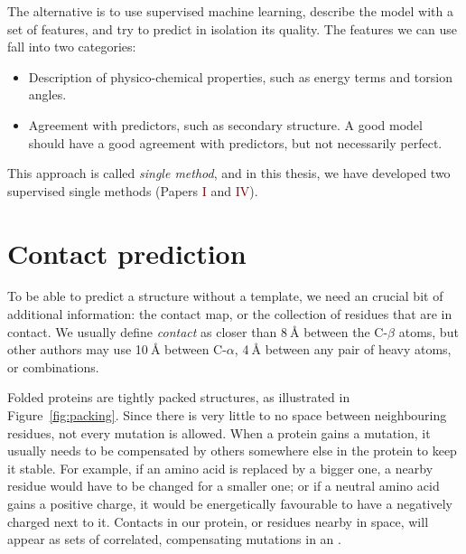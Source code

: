 The alternative is to use supervised machine learning, describe the model with a set of features, and try to predict in isolation its quality. 
The features we can use fall into two categories:

\begin{itemize}
\item Description of physico-chemical properties, such as energy terms and torsion angles.
\item Agreement with predictors, such as secondary structure. A good model should have a good agreement with predictors, but not necessarily perfect.
\end{itemize}

This approach is called \emph{single method}, and in this thesis, we have developed two supervised single methods (Papers \textcolor{Maroon}{I} and \textcolor{Maroon}{IV}).


\section{Contact prediction}\label{sec:contacts}
To be able to predict a structure without a template, we need an crucial  bit of additional information: the contact map, or the collection of residues that are in contact.
We usually define \emph{contact}  as closer than 8$\SI{}{\angstrom}$ between the C-$\beta$ atoms,
but other authors may use 10$\SI{}{\angstrom}$ between C-$\alpha$, 4$\SI{}{\angstrom}$ between any pair of heavy atoms, or combinations.

Folded proteins  are tightly packed structures, as illustrated in Figure~\ref{fig:packing}.
Since there is very little to no space between neighbouring residues, not every mutation is allowed.
When a protein gains a mutation, it usually needs to be compensated by others somewhere else in the protein to keep it stable.
For example, if an amino acid is replaced by a bigger one, a nearby residue would have to be changed for a smaller one; or if a neutral amino acid gains a positive charge, it would be energetically favourable to have a negatively charged next to it.
Contacts in our protein, or residues nearby in space, will appear as sets of correlated, compensating mutations in an \MSA.

